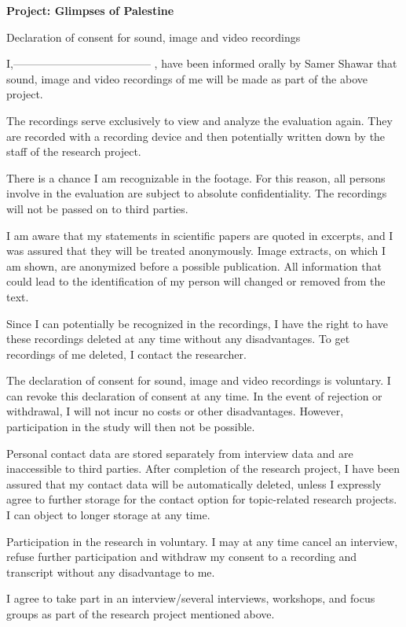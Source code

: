 


\textbf{Project: Glimpses of Palestine}


Declaration of consent for sound, image and video recordings



I,-------------------------------------- , have been informed orally by Samer Shawar that sound, image and video recordings of me will be made as part of the above project.

The recordings serve exclusively to view and analyze the evaluation again. They are recorded with a recording device and then potentially written down by the staff of the research project.

There is a chance I am recognizable in the footage. For this reason, all persons involve in the evaluation are subject to absolute confidentiality. The recordings will not be passed on to third parties.

I am aware that my statements in scientific papers are quoted in excerpts, and I was assured that they will be treated anonymously. Image extracts, on which I am shown, are anonymized before a possible publication. All information that could lead to the identification of my person will changed or removed from the text.

Since I can potentially be recognized in the recordings, I have the right to have these recordings deleted at any time without any disadvantages. To get recordings of me deleted, I contact the researcher.

The declaration of consent for sound, image and video recordings is voluntary. I can revoke this declaration of consent at any time. In the event of rejection or withdrawal, I will not incur no costs or other disadvantages. However, participation in the study will then not be possible.

Personal contact data are stored separately from interview data and are inaccessible to third parties. After completion of the research project, I have been assured that my contact data will be automatically deleted, unless I expressly agree to further storage for the contact option for topic-related research projects. I can object to longer storage at any time.

Participation in the research in voluntary. I may at any time cancel an interview, refuse further participation and withdraw my consent to a recording and transcript without any disadvantage to me.

I agree to take part in an interview/several interviews, workshops, and focus groups as part of the research project mentioned above.



